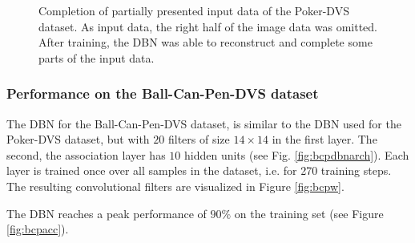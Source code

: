\begin{figure}[h!]
\begin{subfigure}{.25\textwidth}
  		\label{fig:sub1}
	\end{subfigure}%
	\caption[Completion of partially presented input data of the Poker-DVS dataset.]{Completion of partially presented input data of the Poker-DVS dataset. As input data, the right half of the image data was omitted. After training, the DBN was able to reconstruct and complete some parts of the input data.}
	\label{fig:pokercompl}
\end{figure}

\clearpage

\subsubsection{Performance on the Ball-Can-Pen-DVS dataset} \label{c:pokerexp}

The DBN for the Ball-Can-Pen-DVS dataset, is similar to the DBN used for the Poker-DVS dataset, but with $20$ filters of size $14 \times 14$ in the first layer. The second, the association layer has $10$ hidden units (see Fig. \ref{fig:bcpdbnarch}).
Each layer is trained once over all samples in the dataset, i.e. for 270 training steps. 
The resulting convolutional filters are visualized in Figure \ref{fig:bcpw}.

The DBN reaches a peak performance of $90 \%$ on the training set (see Figure \ref{fig:bcpacc}). 

